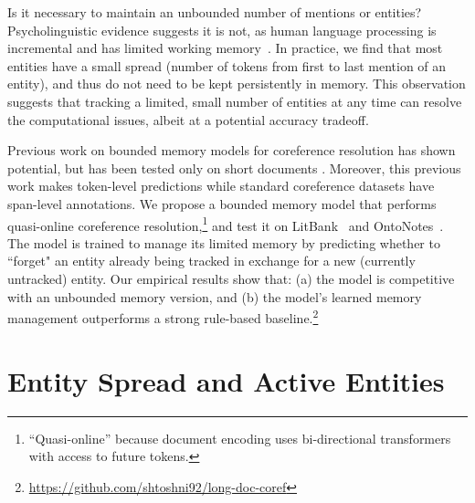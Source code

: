 \documentclass[11pt,a4paper]{article}
\begin{document}
Is it necessary to maintain an unbounded number of mentions or entities?  Psycholinguistic evidence suggests it is not, as human language processing is incremental \citep{Tanenhaus1632, keller2010cognitively} and has limited working memory~\citep{baddeley1986}.
In practice, we find that most entities have a small spread (number of tokens from first to last mention of an entity), and thus do not need to be kept persistently in memory.
This observation suggests that tracking a limited, small number of entities at any time can resolve the computational issues, albeit at a potential accuracy tradeoff.

Previous work on bounded memory models for coreference resolution has shown potential, but has been tested only on short documents  \citep{liu2019referential, toshniwal2020petra}. Moreover, this previous work makes token-level predictions while standard coreference datasets have span-level annotations.  We propose a bounded memory model that performs quasi-online coreference resolution,\footnote{``Quasi-online'' because document encoding uses bi-directional transformers with access to future tokens.}
 and test it on LitBank~\cite{bamman2019annotated} and OntoNotes~\citep{pradhan2012conll}.
The model is trained to manage its limited memory by predicting whether to ``forget" an entity already being tracked in exchange for a new (currently untracked) entity. Our empirical results show that: (a) the model is competitive with an unbounded memory version, and (b) the model's learned memory management outperforms a strong rule-based baseline.\footnote{\url{https://github.com/shtoshni92/long-doc-coref}}


\section{Entity Spread and Active Entities}
\begin{table}[t]
\end{table}
\end{document}
